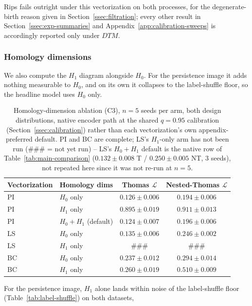 \documentclass[11pt,letterpaper]{article}
\newcommand{\1}{\mathds{1}}
\theoremstyle{plain}
\theoremstyle{definitioncolon}
\begin{document}
Rips fails outright under this vectorization on both processes, for the
degenerate-birth reason given in Section~\ref{ssec:filtration}; every other
result in Section~\ref{ssec:exp-summaries} and
Appendix~\ref{app:calibration-sweeps} is accordingly reported only under
$DTM$.

\subsubsection{Homology dimensions}
\label{ssec:branch-homology}

We also compute the $H_1$ diagram alongside $H_0$. For the persistence image it
adds nothing measurable to $H_0$, and on its own it collapses to the
label-shuffle floor, so the headline model uses $H_0$ only.

\begin{table}[tbp]
\centering
\small
\begin{tabular}{llcc}
\toprule
Vectorization & Homology dims & Thomas $\mathcal{L}$ & Nested-Thomas $\mathcal{L}$ \\
\midrule
PI & $H_0$ only     & $0.126 \pm 0.006$ & $0.194 \pm 0.006$ \\
PI & $H_1$ only     & $0.895 \pm 0.019$ & $0.911 \pm 0.013$ \\
PI & $H_0{+}H_1$ (default) & $0.124 \pm 0.007$ & $0.196 \pm 0.006$ \\
\addlinespace
LS & $H_0$ only     & $0.135 \pm 0.006$ & $0.246 \pm 0.002$ \\
LS & $H_1$ only     & \#\#\# & \#\#\# \\
\addlinespace
BC & $H_0$ only     & $0.237 \pm 0.012$ & $0.294 \pm 0.014$ \\
BC & $H_1$ only     & $0.260 \pm 0.019$ & $0.510 \pm 0.009$ \\
\bottomrule
\end{tabular}
\caption{Homology-dimension ablation (C3), $n=5$ seeds per arm, both design
distributions, native encoder path at the shared $q=0.95$ calibration
(Section~\ref{ssec:calibration}) rather than each vectorization's own
appendix-preferred default. PI and BC are complete;
LS's $H_1$-only arm has not been run (\#\#\# = not yet run) -- LS's
$H_0{+}H_1$ default is the native row of Table~\ref{tab:main-comparison}
($0.132\pm0.008$ T / $0.250\pm0.005$ NT, 3 seeds), not repeated here since it
was not re-run at $n=5$.}
\label{tab:homology-ablation}
\end{table}
For the persistence image, $H_1$ alone lands within noise of the
label-shuffle floor (Table~\ref{tab:label-shuffle}) on both datasets,
\end{document}

